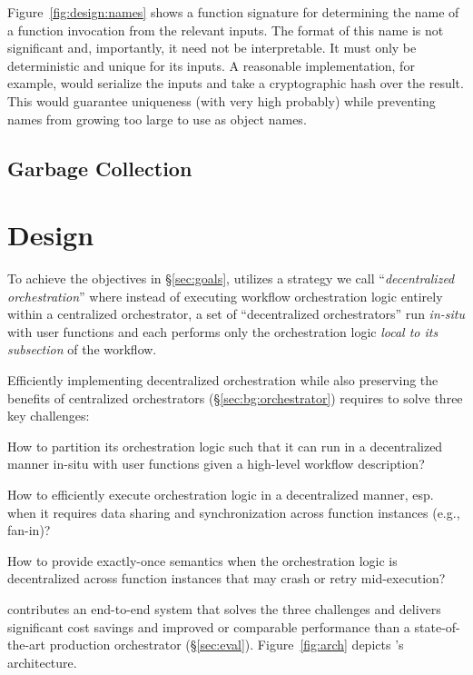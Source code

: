 Figure~\ref{fig:design:names} shows a function signature for determining the name of a
function invocation from the relevant inputs. The format of this name is not
significant and, importantly, it need not be interpretable. It must only be
deterministic and unique for its inputs. A reasonable implementation, for
example, would serialize the inputs and take a cryptographic hash over the
result. This would guarantee uniqueness (with very high probably) while
preventing names from growing too large to use as object names.

\subsection{Garbage Collection}\label{sec:design:garbage}

\section{Design}

To achieve the objectives in \S\ref{sec:goals}, \name{} utilizes a strategy we
call ``\emph{decentralized orchestration}'' where instead of executing
workflow orchestration logic entirely within a centralized orchestrator, a set
of ``decentralized orchestrators'' run \emph{in-situ} with user functions and
each performs only the orchestration logic \emph{local to its subsection} of
the workflow.

Efficiently implementing decentralized orchestration while also preserving the
benefits of centralized orchestrators (\S\ref{sec:bg:orchestrator}) requires
\name{} to solve three key challenges:

\squishenum
	\item How to partition its orchestration logic such that it can run in a
	decentralized manner in-situ with user functions given a high-level workflow description?

	\item How to efficiently execute orchestration logic in a
	decentralized manner, esp. when it requires data sharing and
	synchronization across function instances (e.g., fan-in)?

	\item How to provide exactly-once semantics when the
	orchestration logic is decentralized across function instances that may
	crash or retry mid-execution?
\squishenumend

\name{} contributes an end-to-end system that solves the three challenges and
delivers significant cost savings and improved or comparable performance than
a state-of-the-art production orchestrator (\S\ref{sec:eval}).
Figure~\ref{fig:arch} depicts \name{}'s architecture. 

